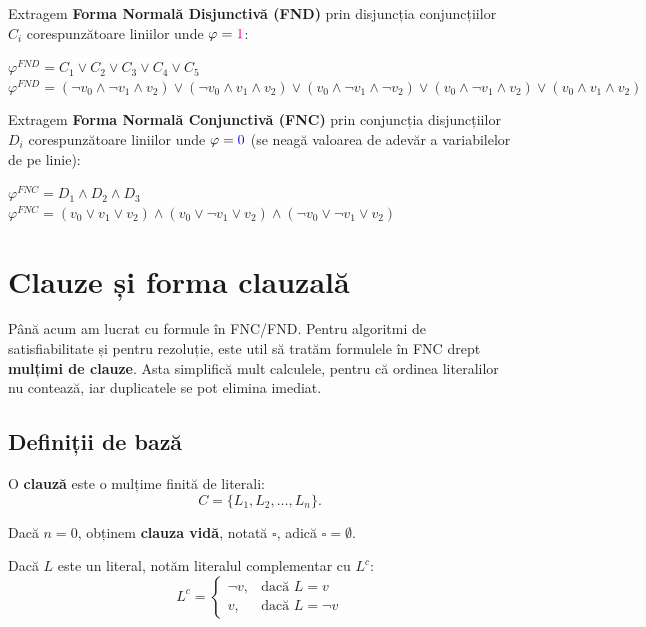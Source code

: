 \begin{solutie}
\noindent Extragem \textbf{Forma Normală Disjunctivă (FND)} prin disjuncția conjuncțiilor $C_i$ corespunzătoare liniilor unde $\varphi = \textcolor{magenta}{1}$:

\vspace{0.2cm}
\noindent $\varphi^{FND} = C_1 \lor C_2 \lor C_3 \lor C_4 \lor C_5$ \\
$\varphi^{FND} = (\neg v_0 \land \neg v_1 \land v_2) \lor (\neg v_0 \land v_1 \land v_2) \lor (v_0 \land \neg v_1 \land \neg v_2) \lor (v_0 \land \neg v_1 \land v_2) \lor (v_0 \land v_1 \land v_2)$

\vspace{0.5cm}

\noindent Extragem \textbf{Forma Normală Conjunctivă (FNC)} prin conjuncția disjuncțiilor $D_i$ corespunzătoare liniilor unde $\varphi = \textcolor{blue}{0}$ (se neagă valoarea de adevăr a variabilelor de pe linie):


\vspace{0.2cm}
\noindent $\varphi^{FNC} = D_1 \land D_2 \land D_3$ \\
$\varphi^{FNC} = (v_0 \lor v_1 \lor v_2) \land (v_0 \lor \neg v_1 \lor v_2) \land (\neg v_0 \lor \neg v_1 \lor v_2)$

\end{solutie}

\section{Clauze și forma clauzală}

Până acum am lucrat cu formule în FNC/FND. Pentru algoritmi de satisfiabilitate și pentru rezoluție, este util să tratăm formulele în FNC drept \textbf{mulțimi de clauze}. Asta simplifică mult calculele, pentru că ordinea literalilor nu contează, iar duplicatele se pot elimina imediat.

\subsection{Definiții de bază}

\begin{definition}
	O \textbf{clauză} este o mulțime finită de literali:
	\[
		C = \{L_1, L_2, \dots, L_n\}.
	\]

	\noindent Dacă \(n = 0\), obținem \textbf{clauza vidă}, notată \( \square \), adică \( \square = \emptyset \).
\end{definition}

Dacă \(L\) este un literal, notăm literalul complementar cu \(L^c\):
\[
	L^c =
	\begin{cases}
		\neg v, & \text{dacă } L = v \\
		v, & \text{dacă } L = \neg v
	\end{cases}
\]

